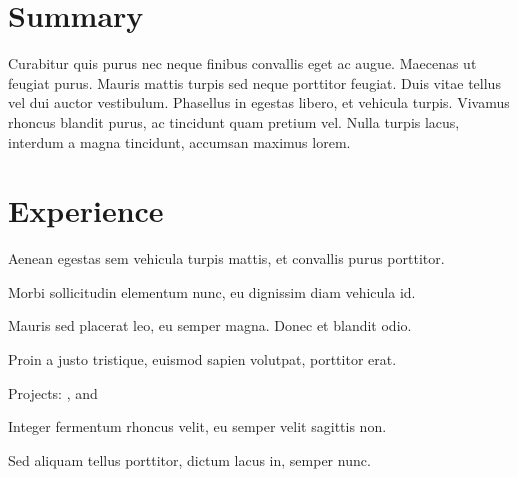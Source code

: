 \documentclass[]{deedy-resume-openfont}
\begin{document}
\begin{minipage}[t]{0.66\textwidth} 

\section{Summary}
Curabitur quis purus nec neque finibus convallis eget ac augue. Maecenas ut feugiat purus. Mauris mattis turpis sed neque porttitor feugiat. Duis vitae tellus vel dui auctor vestibulum. Phasellus in egestas libero, et vehicula turpis. Vivamus rhoncus blandit purus, ac tincidunt quam pretium vel. Nulla turpis lacus, interdum a magna tincidunt, accumsan maximus lorem.
\sectionsep

\section{Experience}

\begin{tightemize}
\item Aenean egestas sem vehicula turpis mattis, et convallis purus porttitor.
\item Morbi sollicitudin elementum nunc, eu dignissim diam vehicula id.
\item Mauris sed placerat leo, eu semper magna. Donec et blandit odio.
\item Proin a justo tristique, euismod sapien volutpat, porttitor erat.
\end{tightemize}
\sectionsep

\begin{tightemize}
\item Projects: 
    \href{https://goo.gl/R@ND0M}{}, 
    \href{https://goo.gl/R@ND0M}{} and 
    \href{https://goo.gl/R@ND0M}{}
\item Integer fermentum rhoncus velit, eu semper velit sagittis non. 
\item Sed aliquam tellus porttitor, dictum lacus in, semper nunc.
\end{tightemize}
\sectionsep


\end{minipage}
\end{document}

